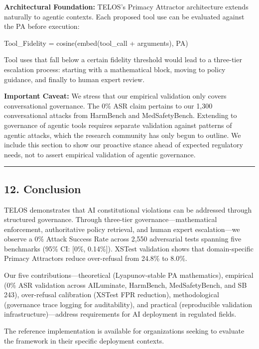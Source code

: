 \textbf{Architectural Foundation:} TELOS's Primacy Attractor
architecture extends naturally to agentic contexts. Each proposed tool
use can be evaluated against the PA before execution:

Tool\_Fidelity = cosine(embed(tool\_call + arguments), PA)

Tool uses that fall below a certain fidelity threshold would lead to a
three-tier escalation process: starting with a mathematical block,
moving to policy guidance, and finally to human expert review.

\textbf{Important Caveat:} We stress that our empirical validation only
covers conversational governance. The 0\% ASR claim pertains to our
1,300 conversational attacks from HarmBench and MedSafetyBench.
Extending to governance of agentic tools requires separate validation
against patterns of agentic attacks, which the research community has
only begun to outline. We include this section to show our proactive
stance ahead of expected regulatory needs, not to assert empirical
validation of agentic governance.

\begin{center}\rule{0.5\linewidth}{0.5pt}\end{center}

\subsection{12. Conclusion}\label{conclusion}

TELOS demonstrates that AI constitutional violations can be addressed
through structured governance. Through three-tier
governance---mathematical enforcement, authoritative policy retrieval,
and human expert escalation---we observe a 0\% Attack Success Rate
across 2,550 adversarial tests spanning five benchmarks (95\% CI:
{[}0\%, 0.14\%{]}). XSTest validation shows that domain-specific Primacy
Attractors reduce over-refusal from 24.8\% to 8.0\%.

Our five contributions---theoretical (Lyapunov-stable PA mathematics),
empirical (0\% ASR validation across AILuminate, HarmBench,
MedSafetyBench, and SB 243), over-refusal calibration (XSTest FPR
reduction), methodological (governance trace logging for auditability),
and practical (reproducible validation infrastructure)---address
requirements for AI deployment in regulated fields.

The reference implementation is available for organizations seeking to
evaluate the framework in their specific deployment contexts.

